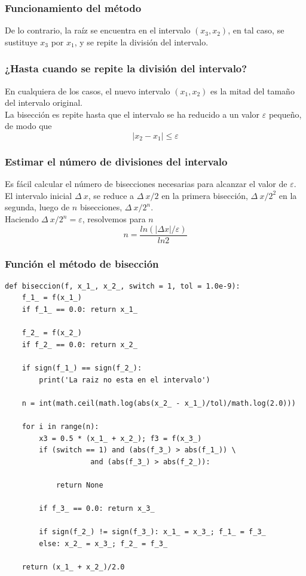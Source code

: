 \begin{frame}
\frametitle{Funcionamiento del método}
De lo contrario, la raíz se encuentra en el intervalo $(x_{3}, x_{2})$, en tal caso, se sustituye $x_{3}$ por $x_{1}$, y se repite la división del intervalo.
\end{frame}
\begin{frame}
\frametitle{¿Hasta cuando se repite la división del intervalo?}
En cualquiera de los casos, el nuevo intervalo $(x_{1}, x_{2})$ es la mitad del tamaño del intervalo original.
\\
\bigskip
La bisección es repite hasta que el intervalo se ha reducido a un valor $\varepsilon$ pequeño, de modo que
\[ \vert x_{2} - x_{1} \vert \leq \varepsilon\]
\end{frame}
\begin{frame}
\frametitle{Estimar el número de divisiones del intervalo}
Es fácil calcular el número de bisecciones necesarias para alcanzar el valor de $\varepsilon$.
\\
\bigskip
\pause
El intervalo inicial $\Delta \: x$, se reduce a $\Delta \: x /2$ en la primera bisección, $\Delta \: x /2^{2}$ en la segunda, luego de $n$ bisecciones, $\Delta \: x /2^{n}$.
\\
\bigskip
\pause
Haciendo $\Delta \: x /2^{n} = \varepsilon$, resolvemos para $n$
\[ n = \dfrac{ln(\vert \Delta x \vert/ \varepsilon)}{ln 2}\]
\end{frame}
\begin{frame}
\frametitle{Función el método de bisección}
\begin{lstlisting}[caption=Método de bisección con \python, style=FormattedNumber, basicstyle=\linespread{1.1}\ttfamily=\small, columns=fullflexible]
def biseccion(f, x_1_, x_2_, switch = 1, tol = 1.0e-9):
    f_1_ = f(x_1_)
    if f_1_ == 0.0: return x_1_
    
    f_2_ = f(x_2_)
    if f_2_ == 0.0: return x_2_
    
    if sign(f_1_) == sign(f_2_):
        print('La raiz no esta en el intervalo')

    n = int(math.ceil(math.log(abs(x_2_ - x_1_)/tol)/math.log(2.0)))
    
    for i in range(n):
        x3 = 0.5 * (x_1_ + x_2_); f3 = f(x_3_)
        if (switch == 1) and (abs(f_3_) > abs(f_1_)) \
                    and (abs(f_3_) > abs(f_2_)):
                        
            return None
        
        if f_3_ == 0.0: return x_3_

        if sign(f_2_) != sign(f_3_): x_1_ = x_3_; f_1_ = f_3_
        else: x_2_ = x_3_; f_2_ = f_3_
    
    return (x_1_ + x_2_)/2.0
\end{lstlisting}
\end{frame}
